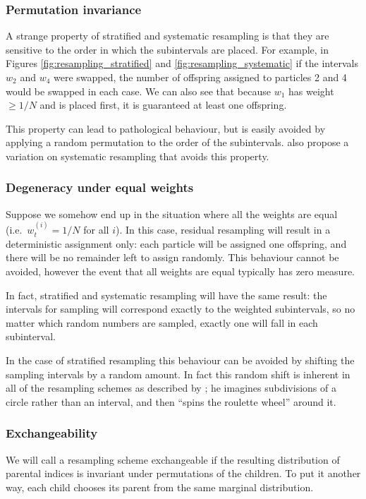 \documentclass[fleqn]{article}
\theoremstyle{definition}
\newcommand{\wt}[2][t]{w_{#1}^{(#2)}}
\begin{document}
\subsubsection{Permutation invariance}
A strange property of stratified and systematic resampling is that they are sensitive to the order in which the subintervals are placed. For example, in Figures \ref{fig:resampling_stratified} and \ref{fig:resampling_systematic} if the intervals $w_2$ and $w_4$ were swapped, the number of offspring assigned to particles 2 and 4 would be swapped in each case. 
We can also see that because $w_1$ has weight $\geq 1/N$ and is placed first, it is guaranteed at least one offspring.

This property can lead to pathological behaviour, but is easily avoided by applying a random permutation to the order of the subintervals.
\citet{gerber2017} also propose a variation on systematic resampling that avoids this property.

\subsubsection{Degeneracy under equal weights}
Suppose we somehow end up in the situation where all the weights are equal (i.e.\ $\wt{i} = 1/N$ for all $i$).
In this case, residual resampling will result in a deterministic assignment only: each particle will be assigned one offspring, and there will be no remainder left to assign randomly. This behaviour cannot be avoided, however the event that all weights are equal typically has zero measure.

In fact, stratified and systematic resampling will have the same result: the intervals for sampling will correspond exactly to the weighted subintervals, so no matter which random numbers are sampled, exactly one will fall in each subinterval.

In the case of stratified resampling this behaviour can be avoided by shifting the sampling intervals by a random amount. In fact this random shift is inherent in all of the resampling schemes as described by \citet{whitley1994}; he imagines subdivisions of a circle rather than an interval, and then ``spins the roulette wheel'' around it.

\subsubsection{Exchangeability}
We will call a resampling scheme exchangeable if the resulting distribution of parental indices is invariant under permutations of the children. To put it another way, each child chooses its parent from the same marginal distribution.
\end{document}
